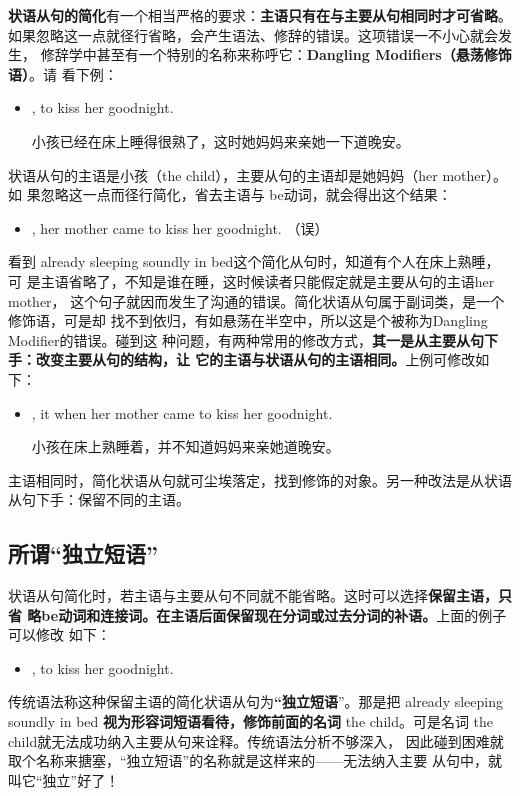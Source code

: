 \textbf{状语从句的简化}有一个相当严格的要求：\textbf{主语只有在与主要从句相同时才可省略}。
如果忽略这一点就径行省略，会产生语法、修辞的错误。这项错误一不小心就会发生，
修辞学中甚至有一个特别的名称来称呼它：\textbf{Dangling Modifiers（悬荡修饰语）}。请
看下例：
\begin{itemize}
\item {},   to kiss her goodnight.

  小孩已经在床上睡得很熟了，这时她妈妈来亲她一下道晚安。
\end{itemize}
状语从句的主语是小孩（the child），主要从句的主语却是她妈妈（her mother）。如
果忽略这一点而径行简化，省去主语与 be动词，就会得出这个结果：
\begin{itemize}
\item {}, her mother
  came to kiss her goodnight. （误）
\end{itemize}
看到 already sleeping soundly in bed这个简化从句时，知道有个人在床上熟睡，可
是主语省略了，不知是谁在睡，这时候读者只能假定就是主要从句的主语her mother，
这个句子就因而发生了沟通的错误。简化状语从句属于副词类，是一个修饰语，可是却
找不到依归，有如悬荡在半空中，所以这是个被称为Dangling Modifier的错误。碰到这
种问题，有两种常用的修改方式，\textbf{其一是从主要从句下手：改变主要从句的结构，让
  它的主语与状语从句的主语相同。}上例可修改如下：
\begin{itemize}
\item {}, 
   it when her mother came to kiss her goodnight.

  小孩在床上熟睡着，并不知道妈妈来亲她道晚安。
\end{itemize}

主语相同时，简化状语从句就可尘埃落定，找到修饰的对象。另一种改法是从状语从句下手：保留不同的主语。

\subsection{所谓“独立短语”}

状语从句简化时，若主语与主要从句不同就不能省略。这时可以选择\textbf{保留主语，只省
略be动词和连接词。在主语后面保留现在分词或过去分词的补语。}上面的例子可以修改
如下：
\begin{itemize}
\item {},   to kiss her goodnight.
\end{itemize}
传统语法称这种保留主语的简化状语从句为\textbf{“独立短语}”。那是把 already
sleeping soundly in bed \textbf{视为形容词短语看待，修饰前面的名词} the
child。可是名词 the child就无法成功纳入主要从句来诠释。传统语法分析不够深入，
因此碰到困难就取个名称来搪塞，“独立短语”的名称就是这样来的——无法纳入主要
从句中，就叫它“独立”好了！


